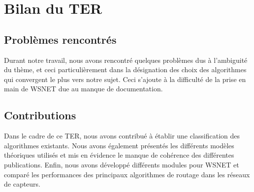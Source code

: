 \section{Bilan du TER}

\subsection{Problèmes rencontrés}
Durant notre travail, nous avons rencontré quelques problèmes dus à l'ambiguité du thème, et ceci particulièrement dans la désignation des choix des algorithmes qui convergent le plus vers notre sujet. Ceci s'ajoute à la difficulté de la prise en main de WSNET due au manque de documentation.

\subsection{Contributions}
Dans le cadre de ce TER, nous avons contribué à établir une classification des algorithmes existants. Nous avons également présentés les différents modèles théoriques utilisés et mis en évidence le manque de cohérence des différentes publications. Enfin, nous avons développé différents modules pour WSNET et comparé les performances des principaux algorithmes de routage dans les réseaux de capteurs.





